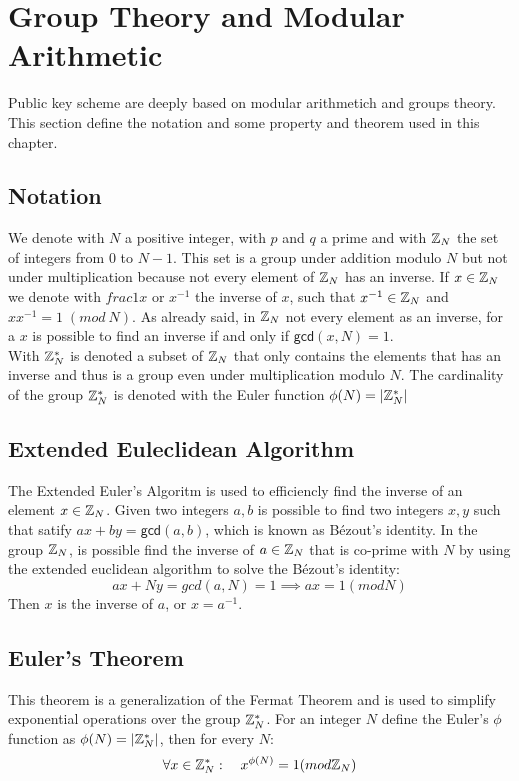\section{Group Theory and Modular Arithmetic}
Public key scheme are deeply based on modular arithmetich and groups theory. This section define the notation and some property and theorem used in this chapter.
\subsection{Notation}
We denote with $N$ a positive integer, with $p$ and $q$ a prime and with $\mathbb{Z}_N$ the set of integers from $0$ to $N-1$. This set is a group under addition modulo $N$ but not under multiplication because not every element of $\mathbb{Z}_N$ has an inverse. If $x \in \mathbb{Z}_N$ we denote with $frac{1}{x}$ or $x^{-1}$ the inverse of $x$, such that $x^{-1} \in \mathbb{Z}_N$ and $xx^{-1} = 1 \; (mod \: N)$. As already said, in $\mathbb{Z}_N$ not every element as an inverse, for a $x$ is possible to find an inverse if and only if $\mathsf{gcd}(x,N) = 1$.\\
With $\mathbb{Z}_N^{*}$ is denoted a subset of $\mathbb{Z}_N$ that only contains the elements that has an inverse and thus is a group even under multiplication modulo $N$. The cardinality of the group $\mathbb{Z}_N^{*}$ is denoted with the Euler function $\phi(N) = |\mathbb{Z}_N^{*}|$
\subsection{Extended Euleclidean Algorithm}
The Extended Euler's Algoritm is used to efficiencly find the inverse of an element $x \in \mathbb{Z}_N$. Given two integers $a, b$ is possible to find two integers $x, y$ such that satify $ax + by = \mathsf{gcd}(a, b)$, which is known as Bézout's identity.
In the group $\mathbb{Z}_N$, is possible find the inverse of $a \in \mathbb{Z}_N$ that is co-prime with $N$ by using the extended euclidean algorithm to solve the Bézout's identity:
$$
   ax+Ny = gcd(a, N) = 1 \implies ax = 1 (mod N)
$$
Then $x$ is the inverse of $a$, or $x = a^{-1}$.
\subsection{Euler's Theorem}
This theorem is a generalization of the Fermat Theorem and is used to simplify exponential operations over the group $\mathbb{Z}_N^{*}$. For an integer $N$ define the Euler's $\phi$ function as $\phi(N) = |\mathbb{Z}_N^{*}|$, then for every $N$:
$$\forall x \in \mathbb{Z}_N^{*}: \quad x^{\phi(N)} = 1 (mod \mathbb{Z}_N)$$
